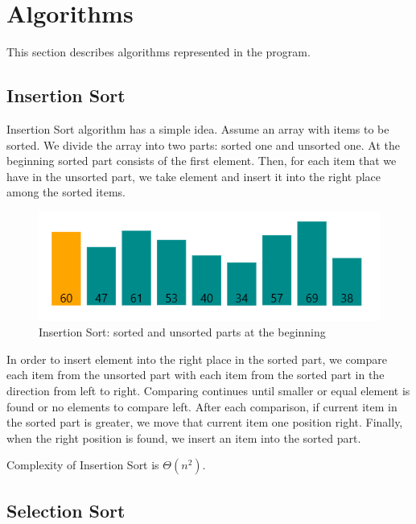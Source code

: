 \documentclass[
  field=inf,
  biblatex,
  language=english,
  glossaries,
  index
]{kidiplom}
\begin{document}
\newpage
\section{Algorithms}

This section describes algorithms represented in the program.

\subsection{Insertion Sort}
\label{sec:insertion}
Insertion Sort algorithm has a simple idea. Assume an array with items to be sorted. We divide the array into two parts: sorted one and unsorted one. At the beginning sorted part consists of the first element. Then, for each item that we have in the unsorted part, we take element and insert it into the right place among the sorted items.

\begin{figure}[H]
\begin{center}
	
	\includegraphics[scale=0.7]{img/Insertion.png}
	\caption{Insertion Sort: sorted and unsorted parts at the beginning}\label{fig:insert}
\end{center}
\end{figure}

In order to insert element into the right place in the sorted part, we compare each item from the unsorted part with each item from the sorted part in the direction from left to right. Comparing continues until smaller or equal element is found or no elements to compare left. After each comparison, if current item in the sorted part is greater, we move that current item one position right. Finally, when the right position is found, we insert an item into the sorted part.

Complexity of Insertion Sort is $\Theta(n^2)$.

\subsection{Selection Sort}
\label{sec:selection}
\end{document}
